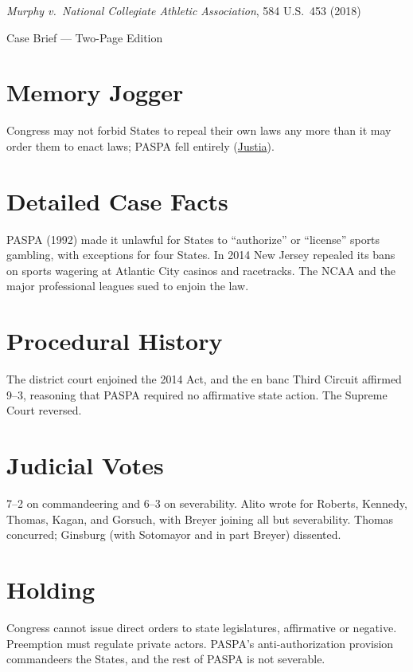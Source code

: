 \documentclass[12pt]{article}
\begin{document}
\begin{center}
{\LARGE \textit{Murphy v.\ National Collegiate Athletic Association}, 584 U.S.\ 453 (2018)\par}
\vspace{0.5em}
{\large Case Brief --- Two-Page Edition\par}
\end{center}

\section{Memory Jogger}
Congress may not forbid States to repeal their own laws any more than it may order them to enact laws; PASPA fell entirely (\href{https://supreme.justia.com/cases/federal/us/584/16-476/}{Justia}).

\section{Detailed Case Facts}
PASPA (1992) made it unlawful for States to ``authorize'' or ``license'' sports gambling, with exceptions for four States. In 2014 New Jersey repealed its bans on sports wagering at Atlantic City casinos and racetracks. The NCAA and the major professional leagues sued to enjoin the law.

\section{Procedural History}
The district court enjoined the 2014 Act, and the en banc Third Circuit affirmed 9--3, reasoning that PASPA required no affirmative state action. The Supreme Court reversed.

\section{Judicial Votes}
7--2 on commandeering and 6--3 on severability. Alito wrote for Roberts, Kennedy, Thomas, Kagan, and Gorsuch, with Breyer joining all but severability. Thomas concurred; Ginsburg (with Sotomayor and in part Breyer) dissented.

\section{Holding}
Congress cannot issue direct orders to state legislatures, affirmative or negative. Preemption must regulate private actors. PASPA's anti-authorization provision commandeers the States, and the rest of PASPA is not severable.
\end{document}
